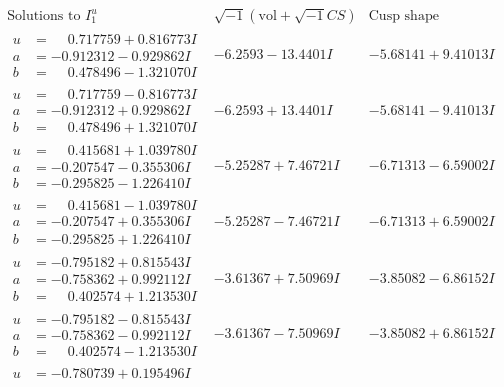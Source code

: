 \documentclass[1p]{elsarticle_modified}
\theoremstyle{definition}
\newcommand{\I}{\sqrt{-1}}
\begin{document}
$$\begin{array}{c|c|c}  
\text{Solutions to }I^u_{1}& \I (\text{vol} + \sqrt{-1}CS) & \text{Cusp shape}\\
 \hline 
\begin{aligned}
u &= \phantom{-}0.717759 + 0.816773 I \\
a &= -0.912312 - 0.929862 I \\
b &= \phantom{-}0.478496 - 1.321070 I\end{aligned}
 & -6.2593 - 13.4401 I & -5.68141 + 9.41013 I \\ \hline\begin{aligned}
u &= \phantom{-}0.717759 - 0.816773 I \\
a &= -0.912312 + 0.929862 I \\
b &= \phantom{-}0.478496 + 1.321070 I\end{aligned}
 & -6.2593 + 13.4401 I & -5.68141 - 9.41013 I \\ \hline\begin{aligned}
u &= \phantom{-}0.415681 + 1.039780 I \\
a &= -0.207547 - 0.355306 I \\
b &= -0.295825 - 1.226410 I\end{aligned}
 & -5.25287 + 7.46721 I & -6.71313 - 6.59002 I \\ \hline\begin{aligned}
u &= \phantom{-}0.415681 - 1.039780 I \\
a &= -0.207547 + 0.355306 I \\
b &= -0.295825 + 1.226410 I\end{aligned}
 & -5.25287 - 7.46721 I & -6.71313 + 6.59002 I \\ \hline\begin{aligned}
u &= -0.795182 + 0.815543 I \\
a &= -0.758362 + 0.992112 I \\
b &= \phantom{-}0.402574 + 1.213530 I\end{aligned}
 & -3.61367 + 7.50969 I & -3.85082 - 6.86152 I \\ \hline\begin{aligned}
u &= -0.795182 - 0.815543 I \\
a &= -0.758362 - 0.992112 I \\
b &= \phantom{-}0.402574 - 1.213530 I\end{aligned}
 & -3.61367 - 7.50969 I & -3.85082 + 6.86152 I \\ \hline\begin{aligned}
u &= -0.780739 + 0.195496 I \\

\end{aligned}
\end{array}$$
\end{document}
